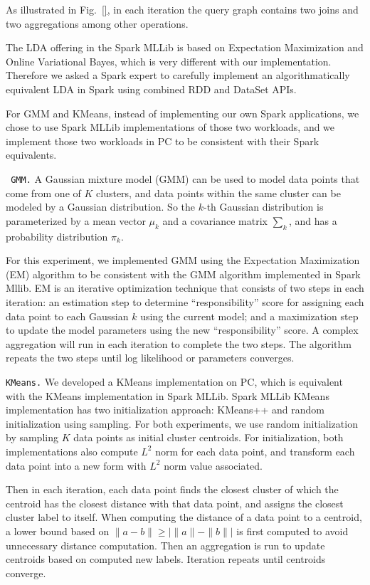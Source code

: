As illustrated in Fig.~\ref{}, in each iteration the query graph contains
two joins and two aggregations among other operations.

The LDA offering in the Spark MLLib is based on Expectation
Maximization and Online Variational Bayes, which is very different
with our implementation. Therefore we asked a Spark expert to carefully implement an algorithmatically
equivalent LDA in Spark using combined RDD and DataSet        
APIs. 

For GMM and KMeans, instead of implementing
our own Spark applications, we chose to use Spark MLLib
implementations of those two workloads, and we implement those two
workloads in PC to be consistent with their Spark equivalents.

\vspace{5pt}
\noindent
\texttt { GMM.} A Gaussian mixture model (GMM) can be used to model data points that come
from one of $K$ clusters, and data points within the same cluster
can be modeled by a Gaussian distribution. So the $k$-th Gaussian
distribution is parameterized by a mean vector $\mu_k$ and a covariance
matrix $\sum_k$, and has a probability distribution $\pi_k$.

For this experiment, we
implemented GMM using the Expectation Maximization (EM) algorithm to be
consistent with the GMM algorithm implemented in Spark Mllib. EM is an
iterative optimization technique that consists of two steps in each
iteration: an estimation step to determine ``responsibility'' score
for assigning each data point to each Gaussian $k$ using the current model; and a maximization step to
update the model parameters using the new ``responsibility'' score. A complex
aggregation will run in each iteration to complete the two steps. The algorithm repeats
the two steps until log likelihood or parameters converges. 

\vspace{5pt}
\noindent
\texttt {KMeans.} We developed a KMeans implementation on PC, which
is equivalent with the KMeans implementation in Spark MLLib. Spark
MLLib KMeans implementation has two initialization approach: KMeans++
and random initialization using sampling. For both experiments, we use
random initialization by sampling $K$ data points as initial
cluster centroids. For initialization, both implementations also compute $L^2$ norm for each data
point, and transform each data point into a new form with $L^2$ norm value
associated. 

Then in each iteration, each data point finds the closest cluster
of which the centroid has the closest distance with that data point, and assigns the closest
cluster label to itself. When computing the distance of a data point to a
centroid, a lower bound based on $\|a - b\| \geq |\|a\| - \|b\||$ is
first computed to avoid unnecessary distance computation. Then an aggregation is run to update centroids
based on computed new labels. Iteration repeats until centroids
converge.


